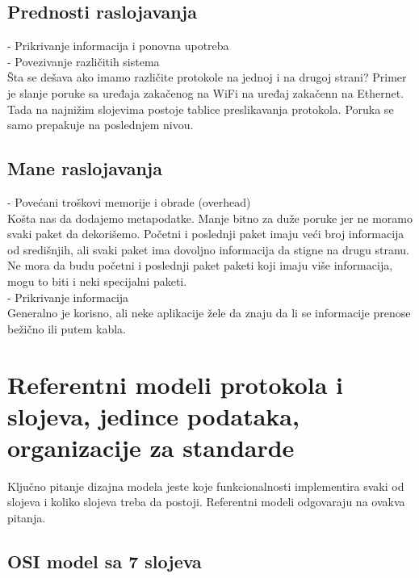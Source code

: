 \documentclass{article} %
\begin{document}
\subsection{Prednosti raslojavanja}
- Prikrivanje informacija i ponovna upotreba\\
- Povezivanje različitih sistema\\
Šta se dešava ako imamo različite protokole na jednoj i na drugoj strani? Primer je slanje poruke sa uređaja zakačenog na WiFi na uređaj zakačenn na Ethernet. Tada na najnižim slojevima postoje tablice preslikavanja protokola. Poruka se samo prepakuje na poslednjem nivou. \\
\subsection{Mane raslojavanja}
- Povećani troškovi memorije i obrade (overhead)\\
Košta nas da dodajemo metapodatke. Manje bitno za duže poruke jer ne moramo svaki paket da dekorišemo. Početni i poslednji paket imaju veći broj informacija od središnjih, ali svaki paket ima dovoljno informacija da stigne na drugu stranu. Ne mora da budu početni i poslednji paket paketi koji imaju više informacija, mogu to biti i neki specijalni paketi. \\
- Prikrivanje informacija\\
Generalno je korisno, ali neke aplikacije žele da znaju da li se informacije prenose bežično ili putem kabla.


\section{Referentni modeli protokola i slojeva, jedince podataka, organizacije za standarde}
Ključno pitanje dizajna modela jeste koje funkcionalnosti implementira svaki od slojeva i koliko slojeva treba da postoji. Referentni modeli odgovaraju na ovakva pitanja. 
\subsection{OSI model sa 7 slojeva}
\end{document}
